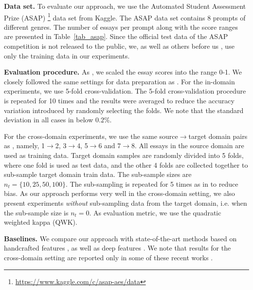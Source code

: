 \documentclass[11pt,a4paper]{article}
\begin{document}
\noindent
{\bf Data set.}
To evaluate our approach, we use the Automated Student Assessment Prize (ASAP) \footnote{\scriptsize{\url{https://www.kaggle.com/c/asap-aes/data}}} data set from Kaggle. The ASAP data set contains 8 prompts of different genres. The number of essays per prompt along with the score ranges are presented in Table~\ref{tab_asap}. Since the official test data of the ASAP competition is not released to the public, we, as well as others before us \cite{Phandi-EMNLP-2015,Dong-EMNLP-2016,Dong-CONLL-2017,Tay-ACL-2018}, use only the training data in our experiments.

\noindent
{\bf Evaluation procedure.}
As , we scaled the essay scores into the range 0-1. We closely followed the same settings for data preparation as \cite{Phandi-EMNLP-2015,Dong-EMNLP-2016}. For the in-domain experiments, we use 5-fold cross-validation. The 5-fold cross-validation procedure is repeated for 10 times and the results were averaged to reduce the accuracy variation introduced by randomly selecting the folds. We note that the standard deviation in all cases in below $0.2\%$.

For the cross-domain experiments, we use the same source$\rightarrow$target domain pairs as \cite{Phandi-EMNLP-2015,Dong-EMNLP-2016}, namely, 1$\rightarrow$2, 3$\rightarrow$4, 5$\rightarrow$6 and 7$\rightarrow$8. All essays in the source domain are used as training data. Target domain samples are randomly divided into 5 folds, where one fold is used as test data, and the other 4 folds are collected together to sub-sample target domain train data. The sub-sample sizes are $n_t = \{ 10, 25, 50, 100 \}$. The sub-sampling is repeated for 5 times as in \cite{Phandi-EMNLP-2015,Dong-EMNLP-2016} to reduce bias. As our approach performs very well in the cross-domain setting, we also present experiments \emph{without} sub-sampling data from the target domain, i.e. when the sub-sample size is $n_t=0$. As evaluation metric, we use the quadratic weighted kappa (QWK).

\noindent
{\bf Baselines.}
We compare our approach with state-of-the-art methods based on handcrafted features \cite{Phandi-EMNLP-2015}, as well as deep features \cite{Dong-EMNLP-2016,Dong-CONLL-2017,Tay-ACL-2018}. We note that results for the cross-domain setting are reported only in some of these recent works \cite{Phandi-EMNLP-2015,Dong-EMNLP-2016}.
\end{document}
